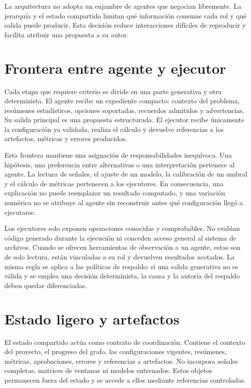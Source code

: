 La arquitectura no adopta un enjambre de agentes que negocian libremente. La
jerarquía y el estado compartido limitan qué información consume cada rol y qué
salida puede producir. Esta decisión reduce interacciones difíciles de
reproducir y facilita atribuir una propuesta a su autor.

\section{Frontera entre agente y ejecutor}

Cada etapa que requiere criterio se divide en una parte generativa y otra
determinista. El agente recibe un expediente compacto: contexto del problema,
resúmenes estadísticos, opciones soportadas, recuerdos admitidos y
advertencias. Su salida principal es una propuesta estructurada. El ejecutor
recibe únicamente la configuración ya validada, realiza el cálculo y devuelve
referencias a los artefactos, métricas y errores producidos.

Esta frontera mantiene una asignación de responsabilidades inequívoca. Una
hipótesis, una preferencia entre alternativas o una interpretación pertenece
al agente. La lectura de señales, el ajuste de un modelo, la calibración de un
umbral y el cálculo de métricas pertenecen a los ejecutores. En consecuencia,
una explicación no puede reemplazar un resultado computado, y una variación
numérica no se atribuye al agente sin reconstruir antes qué configuración llegó
a ejecutarse.

Los ejecutores solo exponen operaciones conocidas y comprobables. No evalúan
código generado durante la ejecución ni conceden acceso general al sistema de
archivos. Cuando se ofrecen herramientas de observación a un agente, estas son
de solo lectura, están vinculadas a su rol y devuelven resultados acotados. La
misma regla se aplica a las políticas de respaldo: si una salida generativa no
es válida y se emplea una decisión determinista, la causa y la autoría del
respaldo deben quedar diferenciadas.

\section{Estado ligero y artefactos}

El estado compartido actúa como contrato de coordinación. Contiene el contexto
del proyecto, el progreso del grafo, las configuraciones vigentes, resúmenes,
métricas, aprobaciones, errores y referencias a artefactos. No incorpora
señales completas, matrices de ventanas ni modelos entrenados. Estos objetos
permanecen fuera del estado y se accede a ellos mediante referencias
controladas.

